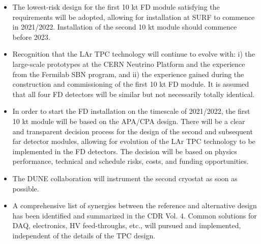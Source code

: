 \begin{itemize}
\item The lowest-risk design for the first 10 kt FD module satisfying the requirements 
will be adopted, allowing for installation at SURF to commence in 2021/2022. Installation 
of the second 10 kt module should commence before 2023.

\item  Recognition that the LAr TPC technology will continue to evolve with: i) the 
large-scale prototypes at the CERN Neutrino Platform and the experience from the 
Fermilab SBN program, and ii) the experience gained during the construction and 
commissioning of the first 10 kt FD module. It is assumed that all four FD detectors 
will be similar but not necessarily totally identical.

\item  In order to start the FD installation on the timescale of 2021/2022, the first 
10 kt module will be based on the APA/CPA design.
There will be a clear and transparent decision process for the design 
of the second and subsequent far detector modules, allowing for evolution of the 
LAr TPC technology to be implemented in the FD detectors. The decision will be 
based on physics performance, technical and schedule risks, costs, and funding 
opportunities.

\item The DUNE collaboration will instrument the second cryostat as soon as possible.

\item A comprehensive list of synergies between the reference and alternative design 
has been identified and summarized in the CDR Vol. 4. Common solutions for DAQ, 
electronics, HV feed-throughs, etc., will pursued and implemented, independent 
of the details of the TPC design.

\end{itemize}

